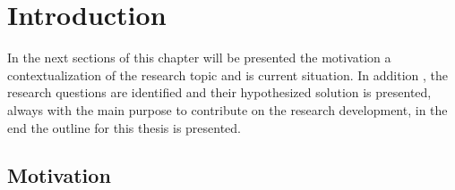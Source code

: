 \newcommand{\novathesis}{\emph{novathesis}}
\newcommand{\novathesisclass}{\texttt{novathesis.cls}}


\chapter{Introduction}
\label{cha:introduction}

In the next sections of this chapter will be  presented the motivation a contextualization of the research topic and is current situation. 
In addition , the research questions are identified and their hypothesized solution is presented, always with the main purpose  to contribute on the research development, in the end the outline for this thesis is presented. 

\section{Motivation} %
\label{sec:motivation}


